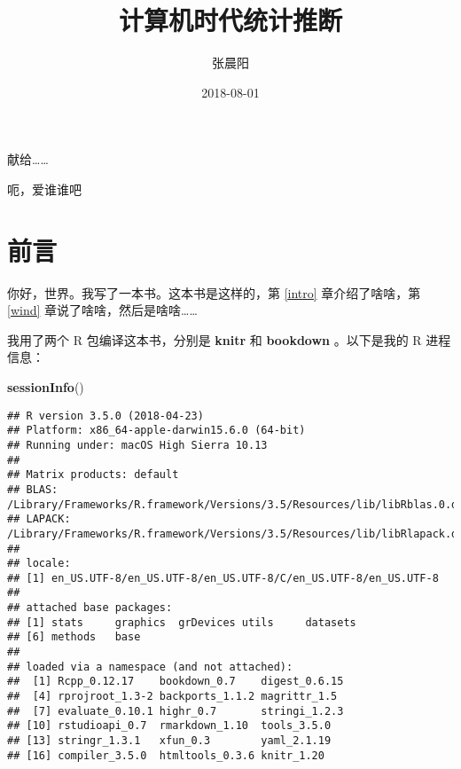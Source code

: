 \documentclass[]{ctexbook}
\title{计算机时代统计推断}
\author{张晨阳}
\date{2018-08-01}
\newenvironment{Shaded}{\begin{snugshade}}{\end{snugshade}}
\newcommand{\KeywordTok}[1]{\textcolor[rgb]{0.13,0.29,0.53}{\textbf{#1}}}
\newcommand{\NormalTok}[1]{#1}
\theoremstyle{definition}
\theoremstyle{definition}
\theoremstyle{definition}
\theoremstyle{remark}
\begin{document}
\maketitle


\thispagestyle{empty}

\begin{center}
献给……

呃，爱谁谁吧
\end{center}

\setlength{\abovedisplayskip}{-5pt}
\setlength{\abovedisplayshortskip}{-5pt}

{
\setcounter{tocdepth}{2}
\tableofcontents
}
\listoftables
\listoffigures
\chapter*{前言}


你好，世界。我写了一本书。这本书是这样的，第 \ref{intro}
章介绍了啥啥，第 \ref{wind} 章说了啥啥，然后是啥啥\ldots{}\ldots{}

我用了两个 R 包编译这本书，分别是 \textbf{knitr}
\citep{xie2015} 和 \textbf{bookdown}
\citep{R-bookdown}。以下是我的 R 进程信息：

\begin{Shaded}
\begin{Highlighting}[]
\KeywordTok{sessionInfo}\NormalTok{()}
\end{Highlighting}
\end{Shaded}

\begin{verbatim}
## R version 3.5.0 (2018-04-23)
## Platform: x86_64-apple-darwin15.6.0 (64-bit)
## Running under: macOS High Sierra 10.13
## 
## Matrix products: default
## BLAS: /Library/Frameworks/R.framework/Versions/3.5/Resources/lib/libRblas.0.dylib
## LAPACK: /Library/Frameworks/R.framework/Versions/3.5/Resources/lib/libRlapack.dylib
## 
## locale:
## [1] en_US.UTF-8/en_US.UTF-8/en_US.UTF-8/C/en_US.UTF-8/en_US.UTF-8
## 
## attached base packages:
## [1] stats     graphics  grDevices utils     datasets 
## [6] methods   base     
## 
## loaded via a namespace (and not attached):
##  [1] Rcpp_0.12.17    bookdown_0.7    digest_0.6.15  
##  [4] rprojroot_1.3-2 backports_1.1.2 magrittr_1.5   
##  [7] evaluate_0.10.1 highr_0.7       stringi_1.2.3  
## [10] rstudioapi_0.7  rmarkdown_1.10  tools_3.5.0    
## [13] stringr_1.3.1   xfun_0.3        yaml_2.1.19    
## [16] compiler_3.5.0  htmltools_0.3.6 knitr_1.20
\end{verbatim}
\end{document}
